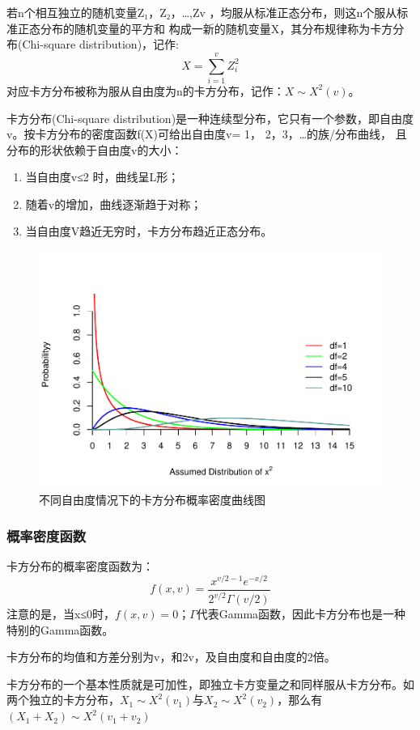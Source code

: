 \documentclass[
]{article}
\providecommand{\tightlist}{%
  \setlength{\itemsep}{0pt}\setlength{\parskip}{0pt}}
\begin{document}
若n个相互独立的随机变量Z₁，Z₂，\ldots,Zv ，均服从标准正态分布，则这n个服从标准正态分布的随机变量的平方和
构成一新的随机变量X，其分布规律称为卡方分布(Chi-square distribution)，记作:
\[X=\sum_{i=1}^vZ_i^2\]
对应卡方分布被称为服从自由度为n的卡方分布，记作：\(X \sim X^2(v)\)。

卡方分布(Chi-square distribution)是一种连续型分布，它只有一个参数，即自由度v。按卡方分布的密度函数f(X)可给出自由度v= 1， 2，3，\ldots 的族/分布曲线，
且分布的形状依赖于自由度v的大小：

\begin{enumerate}
\def\labelenumi{\arabic{enumi}.}
\tightlist
\item
  当自由度v≤2 时，曲线呈L形；
\item
  随着v的增加，曲线逐渐趋于对称；
\item
  当自由度V趋近无穷时，卡方分布趋近正态分布。
\end{enumerate}

\begin{figure}

{\centering \includegraphics[width=0.55\linewidth]{figs/chisquaredfig} 

}

\caption{不同自由度情况下的卡方分布概率密度曲线图}\label{fig:chisquaredfig}
\end{figure}

\hypertarget{ux6982ux7387ux5bc6ux5ea6ux51fdux6570}{%
\subsubsection{概率密度函数}\label{ux6982ux7387ux5bc6ux5ea6ux51fdux6570}}

卡方分布的概率密度函数为：
\[f(x,v)=\frac{x^{v/2-1}e^{-x/2}}{2^{v/2}\Gamma(v/2)}\]
注意的是，当x≤0时，\(f(x,v)=0\)；\(\Gamma\)代表Gamma函数，因此卡方分布也是一种特别的Gamma函数。

卡方分布的均值和方差分别为v，和2v，及自由度和自由度的2倍。

卡方分布的一个基本性质就是可加性，即独立卡方变量之和同样服从卡方分布。如两个独立的卡方分布，\(X_1 \sim X^2(v_1)\)与\(X_2 \sim X^2(v_2)\)，那么有
\((X_1+X_2) \sim X^2(v_1+v_2)\)
\end{document}
